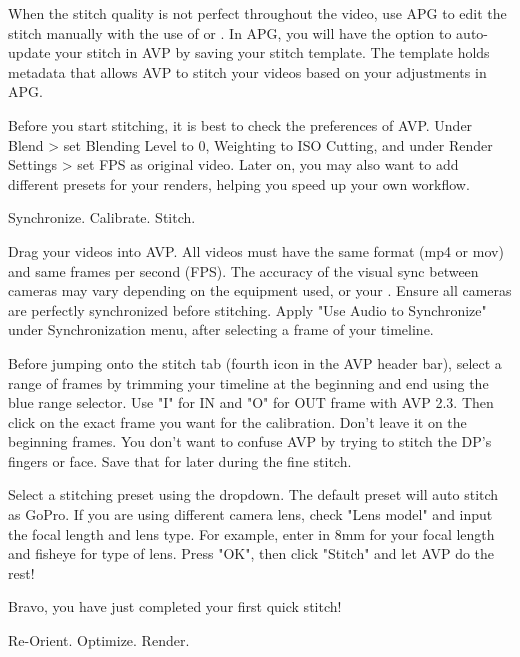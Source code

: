 \begin{fullwidth}
When the stitch quality is not perfect throughout the video, use APG to edit the stitch manually with the use of \textbf{} or \textbf{}. In APG, you will have the option to auto-update your stitch in AVP by saving your stitch template. The template holds metadata that allows AVP to stitch your videos based on your adjustments in APG.

\tip Before you start stitching, it is best to check the preferences of AVP. Under Blend > set Blending Level to 0, Weighting to ISO Cutting, and under Render Settings > set FPS as original video. Later on, you may also want to add different presets for your renders, helping you speed up your own workflow.


{\large Synchronize. Calibrate. Stitch. \par}

Drag your videos into AVP. All videos must have the same format (mp4 or mov) and same frames per second (FPS). The accuracy of the visual sync between cameras may vary depending on the equipment used, or your \textbf{}. Ensure all cameras are perfectly synchronized before stitching. Apply "Use Audio to Synchronize" under Synchronization menu, after selecting a frame of your timeline. 


Before jumping onto the stitch tab (fourth icon in the AVP header bar), select a range of frames by trimming your timeline at the beginning and end using the blue range selector. Use "I" for IN and "O" for OUT frame with AVP 2.3. Then click on the exact frame you want for the calibration. Don't leave it on the beginning frames. You don't want to confuse AVP by trying to stitch the DP's fingers or face. Save that for later during the fine stitch. 


Select a stitching preset using the dropdown. The default preset will auto stitch as GoPro. If you are using different camera lens, check "Lens model" and input the focal length and lens type. For example, enter in 8mm for your focal length and fisheye for type of lens. Press "OK", then click "Stitch" and let AVP do the rest!


Bravo, you have just completed your first quick stitch!

{\large Re-Orient. Optimize. Render. \par}


\end{fullwidth}
